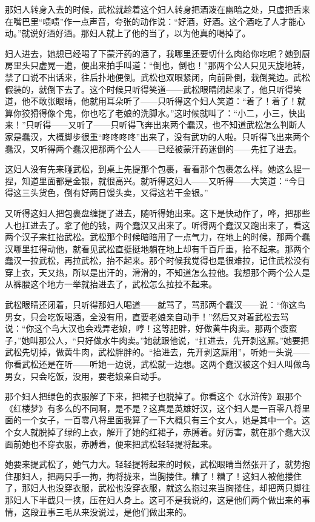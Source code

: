 \par 那妇人转身入去的时候，武松就趁着这个妇人转身把酒泼在幽暗之处，只虚把舌来在嘴巴里“啧啧”作一点声音，夸张的动作说：“好酒，好酒。这个酒吃了人才能心动。”就说好酒好酒。那妇人就上了他的当了，以为他真的喝掉了。
\par 妇人进去，她想已经喝了下蒙汗药的酒了，我哪里还要切什么肉给你吃呢？她到厨房里头只虚晃一遭，便出来拍手叫道：“倒也，倒也！”那两个公人只见天旋地转，禁了口说不出话来，往后扑地便倒。武松也双眼紧闭，向前卧倒，栽倒凳边。武松假装的，就倒下去了。这个时候只听得笑道——武松眼睛闭起来了，他只听得笑道，他不敢张眼睛，他就用耳朵听了——只听得这个妇人笑道：“着了！着了！就算你狡猾得像个鬼，你也吃了老娘的洗脚水。”这时候就叫了：“小二，小三，快出来！”只听得——又听了——只听得飞奔出来两个蠢汉，也不知道武松怎么判断人家是蠢汉，大概脚步很重“咚咚咚咚”出来了，没有武功的人啦。只听得飞出来两个蠢汉，又听得两个蠢汉把那两个公人——已经被蒙汗药迷倒的——先扛了进去。
\par 这妇人没有先来碰武松，到桌上先提那个包裹，看看那个包裹怎么样。她这么捏一捏，知道里面都是金银，就很高兴。就听得这妇人——又听得——大笑道：“今日得这三头货色，倒有好两日馒头卖，又得这若干金银。”
\par 又听得这妇人把包裹盘缠提了进去，随听得她出来。这下是快动作了，哗，把那些人也扛进去了。拿了他的钱，两个蠢汉又出来了。听得两个蠢汉又跑出来了，看这两个汉子来扛抬武松。武松那个时候暗暗用了一点气力，在地上的时候，那两个蠢汉哪里扛得动他，就看见武松直挺挺地躺在地上却有千百斤重，抬不起来。那两个蠢汉一拉武松，再拉武松，抬不起来。那个时候我觉得也是很难拉，记住武松没有穿上衣，天又热，所以是出汗的，滑滑的，不知道怎么拉他。我想那个两个公人是从裤腰这个地方一举就抬进去了，武松怎么拉拉不起来。
\par 武松眼睛还闭着，只听得那妇人喝道——就骂了，骂那两个蠢汉——说：“你这鸟男女，只会吃饭喝酒，全没有用，直要老娘亲自动手！”然后又对着武松去骂说：“你这个鸟大汉也会戏弄老娘，哼！这等肥胖，好做黄牛肉卖。那两个瘦蛮子，”她叫那公人，“只好做水牛肉卖。”她就跟他说，“扛进去，先开剥这厮。”她要把武松先切掉，做黄牛肉，武松胖胖的。“抬进去，先开剥这厮用”，听她一头说——你看武松还是在听——听她一边说，武松就一边想。这两个蠢汉被这个妇人叫做鸟男女，只会吃饭，没用，要老娘亲自动手。
\par 那个妇人把绿色的衣服解了下来，把裙子也脱掉了。你看这个《水浒传》跟那个《红楼梦》有多么的不同啊，是不是？这真是英雄好汉，这个妇人是一百零八将里面的一个女子，一百零八将里面我算了一下大概只有三个女人，她是其中一个。这个女人就脱掉了绿的上衣，解开了她的红裙子，赤膊着。好厉害，就在那个蠢大汉面前她也不穿衣服，赤膊着，便来把武松轻轻提将起来。
\par 她要来提武松了，她气力大。轻轻提将起来的时候，武松眼睛当然张开了，就势抱住那妇人，把两只手一拘，拘将拢来，当胸搂住。糟了！糟了！这妇人被他搂住了，那妇人也没穿衣服，武松也没穿衣服，就这么抱过来当胸搂住，却把两只脚往那妇人下半截只一挟，压在妇人身上。这可不是我说的，这是他们两个做出来的事情，这段丑事三毛从来没说过，是他们做出来的。
